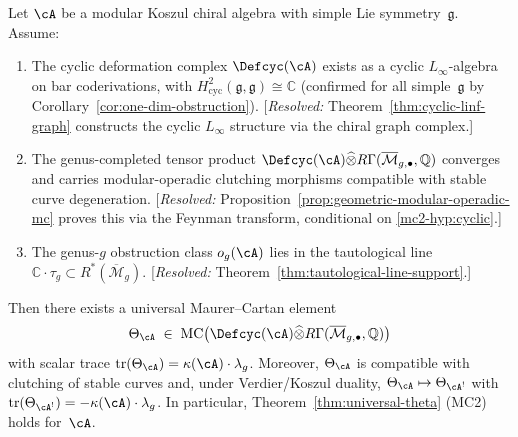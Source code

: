 \begin{theorem}
\label{thm:mc2-conditional-completion}
Let $\cA$ be a modular Koszul chiral algebra with simple Lie
symmetry~$\mathfrak{g}$.  Assume:
\begin{enumerate}[label=\textup{(MC2-\arabic*)}]
\item\label{mc2-hyp:cyclic}
  The cyclic deformation complex $\Defcyc(\cA)$ exists as a cyclic
  $L_\infty$-algebra on bar coderivations, with
  $H^2_{\mathrm{cyc}}(\mathfrak{g},\mathfrak{g}) \cong \mathbb{C}$
  \textup{(}confirmed for all simple~$\mathfrak{g}$ by
  Corollary~\textup{\ref{cor:one-dim-obstruction}}\textup{)}.
  \textup{[}\emph{Resolved:}
  Theorem~\textup{\ref{thm:cyclic-linf-graph}} constructs the
  cyclic $L_\infty$ structure via the chiral graph complex.\textup{]}
\item\label{mc2-hyp:completion}
  The genus-completed tensor product
  $\Defcyc(\cA) \widehat{\otimes}
  R\Gamma(\overline{\mathcal{M}}_{g,\bullet}, \mathbb{Q})$
  converges and carries modular-operadic clutching morphisms
  compatible with stable curve degeneration.
  \textup{[}\emph{Resolved:}
  Proposition~\textup{\ref{prop:geometric-modular-operadic-mc}}
  proves this via the Feynman transform, conditional on
  \textup{\ref{mc2-hyp:cyclic}}.\textup{]}
\item\label{mc2-hyp:tautological}
  The genus-$g$ obstruction class $o_g(\cA)$ lies in the
  tautological line
  $\mathbb{C} \cdot \tau_g \subset R^*(\overline{\mathcal{M}}_g)$.
  \textup{[}\emph{Resolved:}
  Theorem~\textup{\ref{thm:tautological-line-support}}.\textup{]}
\end{enumerate}
Then there exists a universal Maurer--Cartan element
\[
  \Theta_{\cA}
  \;\in\;
  \mathrm{MC}\bigl(
    \Defcyc(\cA) \widehat{\otimes}
    R\Gamma(\overline{\mathcal{M}}_{g,\bullet}, \mathbb{Q})
  \bigr)
\]
with scalar trace
$\operatorname{tr}(\Theta_{\cA}) = \kappa(\cA) \cdot \lambda_g$.
Moreover, $\Theta_{\cA}$ is compatible with clutching of stable
curves and, under Verdier/Koszul duality,
$\Theta_{\cA} \mapsto \Theta_{\cA^!}$ with
$\operatorname{tr}(\Theta_{\cA^!}) = -\kappa(\cA) \cdot \lambda_g$.
In particular, Theorem~\ref{thm:universal-theta}
\textup{(MC2)} holds for~$\cA$.
\end{theorem}


